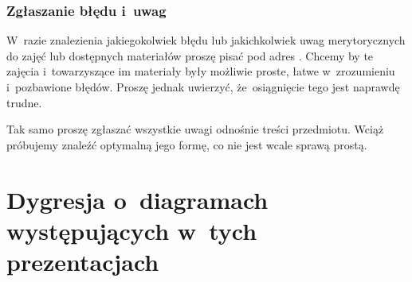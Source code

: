 \documentclass[10pt,t]{beamer}
\begin{document}
\begin{frame}
  \frametitle{Zgłaszanie błędu i~uwag}


  W~razie znalezienia jakiegokolwiek błędu lub jakichkolwiek uwag
  merytorycznych do zajęć lub dostępnych materiałów proszę pisać pod adres
  \email. Chcemy by te zajęcia i~towarzyszące im materiały były możliwie
  proste, łatwe w~zrozumieniu i~pozbawione błędów. Proszę jednak uwierzyć,
  że~osiągnięcie tego jest naprawdę trudne.

  Tak samo proszę zgłaszać wszystkie uwagi odnośnie treści przedmiotu.
  Wciąż próbujemy znaleźć optymalną jego formę, co nie jest wcale sprawą
  prostą.

\end{frame}










\section{Dygresja o~diagramach występujących w~tych
  prezentacjach}
\end{document}
